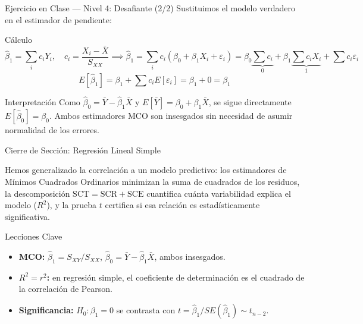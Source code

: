 \documentclass[10pt, aspectratio=169]{beamer}
\begin{document}
\begin{frame}{Ejercicio en Clase --- Nivel 4: Desafiante (2/2)}
  \scriptsize
  Sustituimos el modelo verdadero en el estimador de pendiente: \pause

  \vspace{0.05cm}
  \begin{block}{Cálculo}
    \scriptsize
    $$\hat\beta_1=\sum_i c_i Y_i, \quad c_i=\frac{X_i-\bar X}{S_{XX}} \implies \hat\beta_1=\sum_i c_i(\beta_0+\beta_1X_i+\varepsilon_i)=\beta_0\underbrace{\sum c_i}_{0}+\beta_1\underbrace{\sum c_iX_i}_{1}+\sum c_i\varepsilon_i$$
    $$E[\hat\beta_1]=\beta_1+\sum c_i E[\varepsilon_i]=\beta_1+0=\beta_1$$
  \end{block}

  \vspace{0.05cm}
  \pause
  \begin{alertblock}{Interpretación}
    \scriptsize
    Como $\hat\beta_0=\bar Y-\hat\beta_1\bar X$ y $E[\bar Y]=\beta_0+\beta_1\bar X$, se sigue directamente $E[\hat\beta_0]=\beta_0$. Ambos estimadores MCO son insesgados sin necesidad de asumir normalidad de los errores.
  \end{alertblock}
\end{frame}

\begin{frame}{Cierre de Sección: Regresión Lineal Simple}
  \begin{reflexion}
    Hemos generalizado la correlación a un modelo predictivo: los estimadores de Mínimos Cuadrados Ordinarios minimizan la suma de cuadrados de los residuos, la descomposición $\text{SCT}=\text{SCR}+\text{SCE}$ cuantifica cuánta variabilidad explica el modelo ($R^2$), y la prueba $t$ certifica si esa relación es estadísticamente significativa.
  \end{reflexion}

  \vspace{0.2cm}
  \pause
  \begin{block}{Lecciones Clave}
    \begin{itemize}\itemsep=0.08cm
      \item \textbf{MCO:} $\hat\beta_1=S_{XY}/S_{XX}$, $\hat\beta_0=\bar Y-\hat\beta_1\bar X$, ambos insesgados.
      \item \textbf{$R^2=r^2$:} en regresión simple, el coeficiente de determinación es el cuadrado de la correlación de Pearson.
      \item \textbf{Significancia:} $H_0:\beta_1=0$ se contrasta con $t=\hat\beta_1/SE(\hat\beta_1)\sim t_{n-2}$.
    \end{itemize}
  \end{block}
\end{frame}
\end{document}
